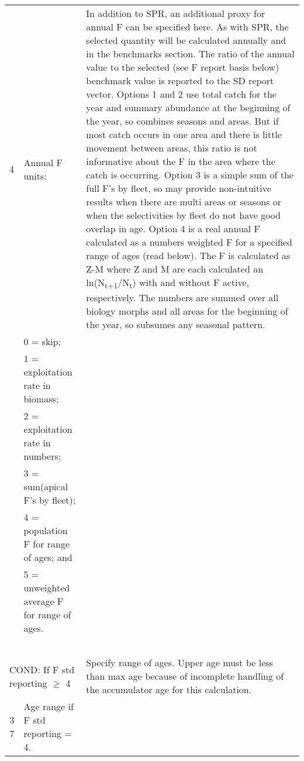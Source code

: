 {\begin{landscape}
\begin{longtable}{p{1.5cm} p{7.2cm} p{12.3cm}}
 \hline 
 4 & Annual F units: &  \multirow{1}{1cm}[-0.25cm]{\parbox{12.5cm}{In addition to SPR, an additional proxy for annual F can be specified here.  As with SPR, the selected quantity will be calculated annually and in the benchmarks section.  The ratio of the annual value to the selected (see F report basis below) benchmark value is reported to the SD report vector.  Options 1 and 2 use total catch for the year and summary abundance at the beginning of the year, so combines seasons and areas.  But if most catch occurs in one area and there is little movement between areas, this ratio is not informative about the F in the area where the catch is occurring.  Option 3 is a simple sum of the full F’s by fleet, so may provide non-intuitive results when there are multi areas or seasons or when the selectivities by fleet do not have good overlap in age.  Option 4 is a real annual F calculated as a numbers weighted F for a specified range of ages (read below).  The F is calculated as Z-M where Z and M are each calculated an ln(N\textsubscript{t+1}/N\textsubscript{t}) with and without F active, respectively. The numbers are summed over all biology morphs and all areas for the beginning of the year, so subsumes any seasonal pattern.}}\Tstrut\\
   & 0 = skip; & \\
   & 1 = exploitation rate in biomass; & \\
   & 2 = exploitation rate in numbers; & \\

   & 3 = sum(apical F's by fleet); & \\
   & 4 = population F for range of ages; and & \\
   & 5 = unweighted average F for range of ages. & \\
   & & \\
   & & \\
   & & \\
   & & \\
   & & \\ 
  
 \hline
 \multicolumn{2}{l}{COND: If F std reporting $\geq$ 4 } & \multirow{1}{1cm}[-0.25cm]{\parbox{12.5cm}{Specify range of ages. Upper age must be less than max age because of incomplete handling of the accumulator age for this calculation.}} \Tstrut\\

 \multicolumn{1}{r}{3 7}  & Age range if F std reporting = 4. & \Tstrut\\


\end{longtable}
\end{landscape}}
